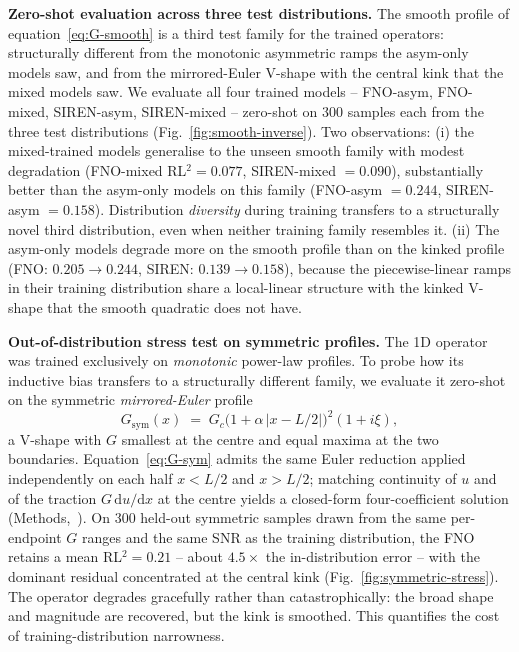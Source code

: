 \documentclass[11pt,letterpaper]{article}
\begin{document}
\textbf{Zero-shot evaluation across three test distributions.}
The smooth profile of equation~\eqref{eq:G-smooth} is a third test
family for the trained operators: structurally different from the
monotonic asymmetric ramps the asym-only models saw, and from the
mirrored-Euler V-shape with the central kink that the mixed models
saw. We evaluate all four trained models -- FNO-asym, FNO-mixed,
SIREN-asym, SIREN-mixed -- zero-shot on 300 samples each from the
three test distributions (Fig.~\ref{fig:smooth-inverse}). Two
observations: (i) the mixed-trained models generalise to the unseen
smooth family with modest degradation
(FNO-mixed RL$^{2}=0.077$, SIREN-mixed $=0.090$), substantially better
than the asym-only models on this family (FNO-asym $=0.244$,
SIREN-asym $=0.158$). Distribution \emph{diversity} during training
transfers to a structurally novel third distribution, even when neither
training family resembles it. (ii) The asym-only models degrade more
on the smooth profile than on the kinked profile
(FNO: $0.205\!\to\!0.244$, SIREN: $0.139\!\to\!0.158$), because the
piecewise-linear ramps in their training distribution share a
local-linear structure with the kinked V-shape that the smooth
quadratic does not have.

\textbf{Out-of-distribution stress test on symmetric profiles.}
The 1D operator was trained exclusively on \emph{monotonic} power-law
profiles. To probe how its inductive bias transfers to a structurally
different family, we evaluate it zero-shot on the symmetric
\emph{mirrored-Euler} profile
\begin{equation}
G_{\mathrm{sym}}(x)\;=\;G_{c}\bigl(1 + \alpha\,|x - L/2|\bigr)^{2}(1+i\xi),
\label{eq:G-sym}
\end{equation}
a V-shape with $G$ smallest at the centre and equal maxima at the two
boundaries. Equation~\eqref{eq:G-sym} admits the same Euler reduction
applied independently on each half $x\!<\!L/2$ and $x\!>\!L/2$; matching
continuity of $u$ and of the traction $G\,\mathrm{d}u/\mathrm{d}x$ at the
centre yields a closed-form four-coefficient solution
(Methods,~). On 300 held-out symmetric
samples drawn from the same per-endpoint $G$ ranges and the same SNR as
the training distribution, the FNO retains a mean RL$^{2}=0.21$ -- about
$4.5\!\times\!$ the in-distribution error -- with the dominant residual
concentrated at the central kink (Fig.~\ref{fig:symmetric-stress}). The
operator degrades gracefully rather than catastrophically: the broad
shape and magnitude are recovered, but the kink is smoothed. This
quantifies the cost of training-distribution narrowness.
\end{document}

